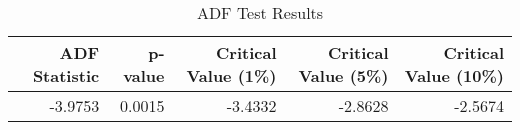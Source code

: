 \begin{table}
\caption{ADF Test Results}
\label{tab:adf_test_results}
\begin{tabular}{rrrrr}
\toprule
ADF Statistic & p-value & Critical Value (1\%) & Critical Value (5\%) & Critical Value (10\%) \\
\midrule
-3.9753 & 0.0015 & -3.4332 & -2.8628 & -2.5674 \\
\bottomrule
\end{tabular}
\end{table}
